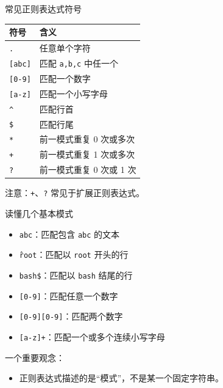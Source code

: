 \documentclass[aspectratio=169]{beamer}
\begin{document}
\begin{frame}{常见正则表达式符号}
\begin{center}
\begin{tabular}{ll}
\toprule
符号 & 含义 \\
\midrule
\texttt{.} & 任意单个字符 \\
\texttt{[abc]} & 匹配 \texttt{a,b,c} 中任一个 \\
\texttt{[0-9]} & 匹配一个数字 \\
\texttt{[a-z]} & 匹配一个小写字母 \\
\texttt{\^} & 匹配行首 \\
\texttt{\$} & 匹配行尾 \\
\texttt{*} & 前一模式重复 0 次或多次 \\
\texttt{+} & 前一模式重复 1 次或多次 \\
\texttt{?} & 前一模式重复 0 次或 1 次 \\
\bottomrule
\end{tabular}
\end{center}

\vspace{0.5em}
注意：\texttt{+}、\texttt{?} 常见于扩展正则表达式。
\end{frame}

\begin{frame}{读懂几个基本模式}
\begin{itemize}
  \item \texttt{abc}：匹配包含 \texttt{abc} 的文本
  \item \texttt{\^root}：匹配以 \texttt{root} 开头的行
  \item \texttt{bash\$}：匹配以 \texttt{bash} 结尾的行
  \item \texttt{[0-9]}：匹配任意一个数字
  \item \texttt{[0-9][0-9]}：匹配两个数字
  \item \texttt{[a-z]+}：匹配一个或多个连续小写字母
\end{itemize}

\vspace{0.8em}
一个重要观念：
\begin{itemize}
  \item 正则表达式描述的是“模式”，不是某一个固定字符串。
\end{itemize}
\end{frame}
\end{document}

